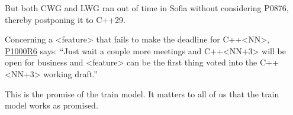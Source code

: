 But both CWG and LWG ran out of time in Sofia without considering P0876,
thereby postponing it to C++29.

Concerning a <feature> that fails to make the deadline for C++<NN>,
\href{https://www.open-std.org/jtc1/sc22/wg21/docs/papers/2024/p1000r6.pdf}{P1000R6}
says:
``Just wait a couple more meetings and C++<NN+3> will be open for business and <feature> can be
the first thing voted into the C++<NN+3> working draft.''

This is the promise of the train model. It matters to all of us that the train
model works as promised.

